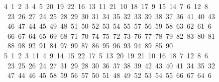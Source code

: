 \begin{tabbing}
4\ 1\ 2\ 3\ 4\ 5\ 20\ 19\ 22\ 16\ 13\ 11\ 21\ 10\ 18\ 17\ 9\ 15\ 14\ 7\ 6\ 12\ 8\\[0pt]
\>\ 23\ 26\ 27\ 24\ 25\ 28\ 29\ 30\ 31\ 34\ 35\ 32\ 33\ 39\ 38\ 37\ 36\ 41\ 40\ 43\ \\[0pt]
\ 46\ 47\ 44\ 45\ 49\ 48\ 51\ 50\ 52\ 53\ 54\ 55\ 57\ 56\ 59\ 58\ 63\ 62\ 61\ 6\\[0pt]
\ 66\ 67\ 64\ 65\ 69\ 68\ 71\ 70\ 74\ 75\ 72\ 73\ 76\ 77\ 78\ 79\ 82\ 83\ 80\ 81\\[0pt]
\>\ 88\ 98\ 92\ 91\ 84\ 97\ 99\ 87\ 86\ 95\ 96\ 93\ 94\ 89\ 85\ 90\\[0pt]
5\ 1\ 2\ 3\ 11\ 4\ 9\ 14\ 15\ 22\ 17\ 5\ 13\ 20\ 19\ 21\ 10\ 16\ 18\ 7\ 12\ 8\ 6\\[0pt]
\>\ 23\ 25\ 26\ 24\ 27\ 31\ 29\ 28\ 30\ 36\ 37\ 38\ 39\ 42\ 43\ 40\ 41\ 34\ 35\ 32\ \\[0pt]
\ 47\ 44\ 46\ 45\ 58\ 59\ 56\ 57\ 50\ 51\ 48\ 49\ 52\ 53\ 54\ 55\ 66\ 67\ 64\ 6\\[0pt]

\end{tabbing}

